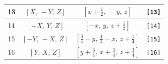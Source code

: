 \documentclass[fleqn,8pt]{jsarticle}
\begin{document}
\begin{longtable}{cccc}
13 & $\left[ X,\, - Y,\, Z \right]$ & $\left[ x + \frac{1}{2},\, - y,\, z \right]$ & {\tt [13]} \\ \hline
14 & $\left[ - X,\, Y,\, Z \right]$ & $\left[ - x,\, y,\, z + \frac{1}{2} \right]$ & {\tt [14]} \\ \hline
15 & $\left[ - Y,\, - X,\, Z \right]$ & $\left[ \frac{3}{4} - y,\, \frac{1}{4} - x,\, z + \frac{1}{4} \right]$ & {\tt [15]} \\ \hline
16 & $\left[ Y,\, X,\, Z \right]$ & $\left[ y + \frac{3}{4},\, x + \frac{3}{4},\, z + \frac{3}{4} \right]$ & {\tt [16]} \\
\end{longtable}
\end{document}
